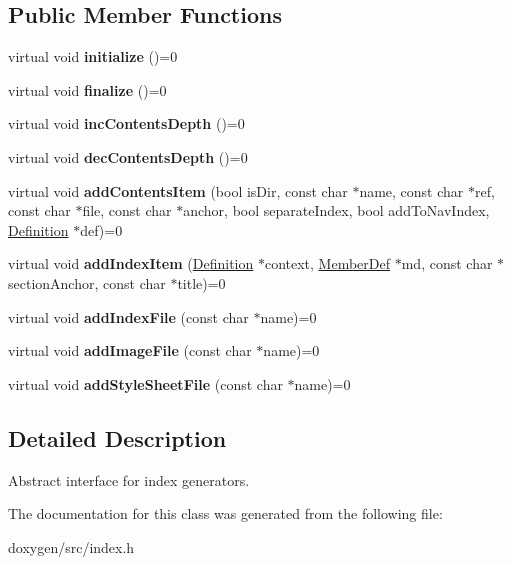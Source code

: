 \subsection*{Public Member Functions}
\begin{DoxyCompactItemize}
\item 
\mbox{\label{class_index_intf_a0e46b4afa0ed269e2d089c8444590515}} 
virtual void {\bfseries initialize} ()=0
\item 
\mbox{\label{class_index_intf_aa5532a767c4ac41167d014209b2ea8d7}} 
virtual void {\bfseries finalize} ()=0
\item 
\mbox{\label{class_index_intf_ac5ff1647bcf1cc65543258df162a0a7c}} 
virtual void {\bfseries inc\+Contents\+Depth} ()=0
\item 
\mbox{\label{class_index_intf_a920918399556e9afd4d927de3d1f4247}} 
virtual void {\bfseries dec\+Contents\+Depth} ()=0
\item 
\mbox{\label{class_index_intf_aab43652b639ce5cd25f5b16e54e20f26}} 
virtual void {\bfseries add\+Contents\+Item} (bool is\+Dir, const char $\ast$name, const char $\ast$ref, const char $\ast$file, const char $\ast$anchor, bool separate\+Index, bool add\+To\+Nav\+Index, \mbox{\hyperlink{class_definition}{Definition}} $\ast$def)=0
\item 
\mbox{\label{class_index_intf_a762276e6f0229fb784a592acd2cf6a8b}} 
virtual void {\bfseries add\+Index\+Item} (\mbox{\hyperlink{class_definition}{Definition}} $\ast$context, \mbox{\hyperlink{class_member_def}{Member\+Def}} $\ast$md, const char $\ast$section\+Anchor, const char $\ast$title)=0
\item 
\mbox{\label{class_index_intf_a153c5c5995155d112c33fed544b44094}} 
virtual void {\bfseries add\+Index\+File} (const char $\ast$name)=0
\item 
\mbox{\label{class_index_intf_ac1650d4596d97cdd1de428b06a76daad}} 
virtual void {\bfseries add\+Image\+File} (const char $\ast$name)=0
\item 
\mbox{\label{class_index_intf_a3989fce1306feb90e477cb53fd0daee0}} 
virtual void {\bfseries add\+Style\+Sheet\+File} (const char $\ast$name)=0
\end{DoxyCompactItemize}


\subsection{Detailed Description}
Abstract interface for index generators. 

The documentation for this class was generated from the following file\+:\begin{DoxyCompactItemize}
\item 
doxygen/src/index.\+h\end{DoxyCompactItemize}
